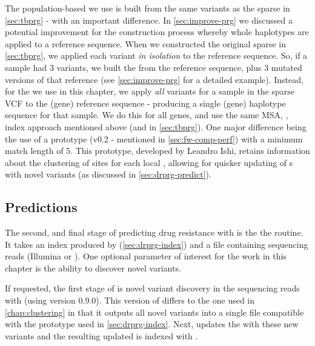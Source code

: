 The population-based \prg{} we use is built from the same variants as the sparse \prg{} in \autoref{sec:tbprg} - with an important difference. In \autoref{sec:improve-prg} we discussed a potential improvement for the \prg{} construction process whereby whole haplotypes are applied to a reference sequence. When we constructed the original sparse \prg{} in \autoref{sec:tbprg}, we applied each variant \emph{in isolation} to the reference sequence. So, if a sample had 3 variants, we built the \prg{} from the reference sequence, plus 3 mutated versions of that reference (see \autoref{sec:improve-prg} for a detailed example). Instead, for the \prg{} we use in this chapter, we apply \emph{all} variants for a sample in the sparse VCF to the (gene) reference sequence - producing a single (gene) haplotype sequence for that sample. We do this for all genes, and use the same MSA, \makeprg{}, \pandora{} index approach mentioned above (and in \autoref{sec:tbprg}). One major difference being the use of a \makeprg{} prototype (v0.2 - mentioned in \autoref{sec:fw-comp-perf}) with a minimum match length of 5. This prototype, developed by Leandro Ishi, retains information about the clustering of sites for each local \prg{}, allowing for quicker updating of \prg{}s with novel variants (as discussed in \autoref{sec:drprg-predict}).


\subsection{Predictions}
\label{sec:drprg-predict}
The second, and final stage of predicting drug resistance with \drprg{} is the the  routine. It takes an index produced by \drprg{}  (\autoref{sec:drprg-index}) and a file containing sequencing reads (Illumina or \ont{}). One optional parameter of interest for the work in this chapter is the ability to discover novel variants.

If requested, the first stage of \drprg{}  is novel variant discovery in the sequencing reads with \pandora{}  (using version 0.9.0). This version of \pandora{} differs to the one used in \autoref{chap:clustering} in that it outputs all novel variants into a single file compatible with the \makeprg{} prototype used in \autoref{sec:drprg-index}. Next, \makeprg{} updates the \drprg{} \prg{} with these new variants and the resulting updated \prg{} is indexed with \pandora{}. 

